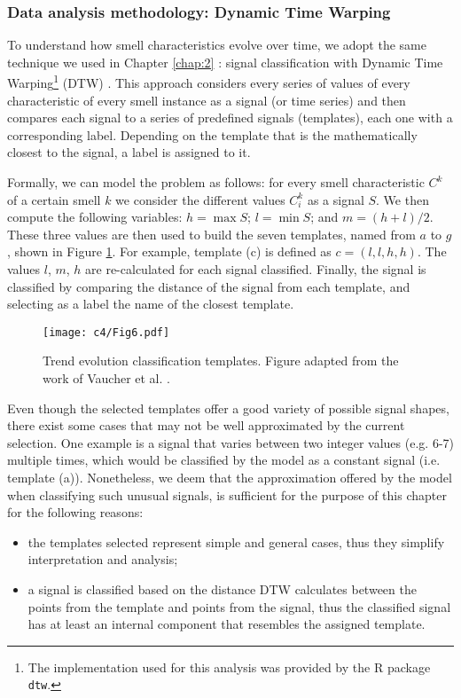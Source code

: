 \subsubsection{Data analysis methodology: Dynamic Time Warping}\label{c4:sec:methodology-rq1.1}
To understand how smell characteristics evolve over time, we adopt the same technique we used in Chapter \ref{chap:2} \cite{Vaucher2009}: signal classification with Dynamic Time Warping\footnote{The implementation used for this analysis was provided by the R package \texttt{dtw}.} (DTW) \cite{Kruskal1983}.
This approach considers every series of values of every characteristic of every smell instance as a signal (or time series) and then compares each signal to a series of predefined signals (templates), each one with a corresponding label. 
Depending on the template that is the mathematically closest to the signal, a label is assigned to it.

Formally, we can model the problem as follows: for every smell characteristic $C^{k}$ of a certain smell $k$ we consider the different values $C^{k}_i$ as a signal $S$. We then compute the following variables: $h = \max S$; $l = \min S$; and $m = (h+l)/2$.
These three values are then used to build the seven templates, named from $a$ to $g$, shown in Figure \ref{c4:fig:classification-templates}. For example, template (c) is defined as $c = (l, l, h, h)$.
The values $l$, $m$, $h$ are re-calculated for each signal classified.
Finally, the signal is classified by comparing the distance of the signal from each template, and selecting as a label the name of the closest template. 

\begin{figure}[h]
    \centering
    \texttt{[image: c4/Fig6.pdf]}
    \caption{Trend evolution classification templates. Figure adapted from the work of Vaucher et al. \cite{Vaucher2009}.}\label{c4:fig:classification-templates}
\end{figure}

Even though the selected templates offer a good variety of possible signal shapes, there exist some cases that may not be well approximated by the current selection.
One example is a signal that varies between two integer values (e.g. 6-7) multiple times, which would be classified by the model as a constant signal (i.e. template (a)).
Nonetheless, we deem that the approximation offered by the model when classifying such unusual signals, is sufficient for the purpose of this chapter for the following reasons:
\begin{itemize}
    \item the templates selected represent simple and general cases, thus they simplify interpretation and analysis;
    \item a signal is classified based on the distance DTW calculates between the points from the template and points from the signal, thus the classified signal has at least an internal component that resembles the assigned template.
\end{itemize}

